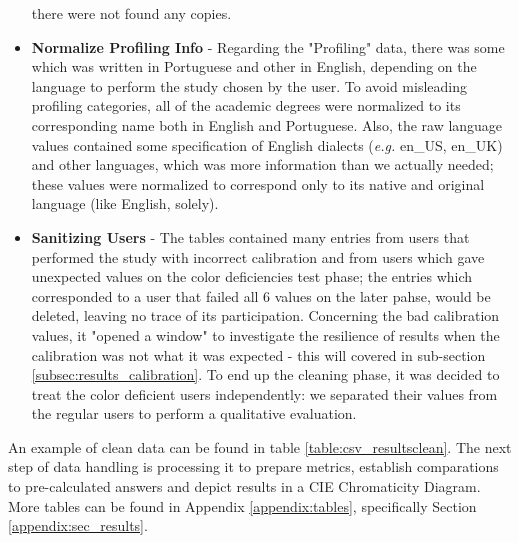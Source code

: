 \begin{itemize}
  there were not found any copies.
  \item \textbf{Normalize Profiling Info} - Regarding the "Profiling" data, there was some which was written in Portuguese and other in English, depending on
  the language to perform the study chosen by the user. To avoid misleading profiling categories, all of the academic degrees were normalized to its corresponding
  name both in English and Portuguese. Also, the raw language values contained some specification of English dialects (\emph{e.g.} en\_US, en\_UK) and other languages,
  which was more information than we actually needed; these values were normalized to correspond only to its native and original language (like English, solely).
  \item \textbf{Sanitizing Users} - The tables contained many entries from users that performed the study with incorrect calibration and from users which
  gave unexpected values on the color deficiencies test phase; the entries which corresponded to a user that failed all 6 values on the later pahse, would be
  deleted, leaving no trace of its participation. Concerning the bad calibration values, it "opened a window" to investigate the resilience of results when the
  calibration was not what it was expected - this will covered in sub-section \ref{subsec:results_calibration}. To end up the cleaning phase,
  it was decided to treat the color deficient users independently: we separated their values from the regular users to perform a qualitative evaluation.
\end{itemize} \par
%
An example of clean data can be found in table \ref{table:csv_resultsclean}. The next step of data handling is processing it to prepare metrics, establish comparations
to pre-calculated answers and depict results in a CIE Chromaticity Diagram. More tables can be found in Appendix \ref{appendix:tables}, specifically Section
\ref{appendix:sec_results}. \par
%
